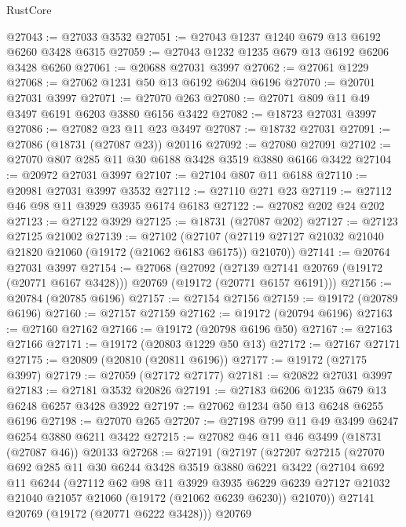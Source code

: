 \begin{lexlean}{RustCore}
\begin{coremodule}
@27043 := @27033 @3532
@27051 := @27043 @1237 @1240 @679 @13 @6192 @6260 @3428 @6315
@27059 := @27043 @1232 @1235 @679 @13 @6192 @6206 @3428 @6260
@27061 := @20688 @27031 @3997
@27062 := @27061 @1229
@27068 := @27062 @1231 @50 @13 @6192 @6204 @6196
@27070 := @20701 @27031 @3997
@27071 := @27070 @263
@27080 := @27071 @809 @11 @49 @3497 @6191 @6203 @3880 @6156 @3422
@27082 := @18723 @27031 @3997
@27086 := @27082 @23 @11 @23 @3497
@27087 := @18732 @27031
@27091 := @27086 (@18731 (@27087 @23)) @20116
@27092 := @27080 @27091
@27102 := @27070 @807 @285 @11 @30 @6188 @3428 @3519 @3880 @6166 @3422
@27104 := @20972 @27031 @3997
@27107 := @27104 @807 @11 @6188
@27110 := @20981 @27031 @3997 @3532
@27112 := @27110 @271 @23
@27119 := @27112 @46 @98 @11 @3929 @3935 @6174 @6183
@27122 := @27082 @202 @24 @202
@27123 := @27122 @3929
@27125 := @18731 (@27087 @202)
@27127 := @27123 @27125 @21002
@27139 := @27102
    (@27107 (@27119 @27127 @21032 @21040 @21820 @21060 (@19172 (@21062 @6183 @6175)) @21070))
@27141 := @20764 @27031 @3997
@27154 := @27068
    (@27092
      (@27139 @27141 @20769 (@19172 (@20771 @6167 @3428)))
      @20769
      (@19172 (@20771 @6157 @6191)))
@27156 := @20784 (@20785 @6196)
@27157 := @27154 @27156
@27159 := @19172 (@20789 @6196)
@27160 := @27157 @27159
@27162 := @19172 (@20794 @6196)
@27163 := @27160 @27162
@27166 := @19172 (@20798 @6196 @50)
@27167 := @27163 @27166
@27171 := @19172 (@20803 @1229 @50 @13)
@27172 := @27167 @27171
@27175 := @20809 (@20810 (@20811 @6196))
@27177 := @19172 (@27175 @3997)
@27179 := @27059 (@27172 @27177)
@27181 := @20822 @27031 @3997
@27183 := @27181 @3532 @20826
@27191 := @27183 @6206 @1235 @679 @13 @6248 @6257 @3428 @3922
@27197 := @27062 @1234 @50 @13 @6248 @6255 @6196
@27198 := @27070 @265
@27207 := @27198 @799 @11 @49 @3499 @6247 @6254 @3880 @6211 @3422
@27215 := @27082 @46 @11 @46 @3499 (@18731 (@27087 @46)) @20133
@27268 := @27191
    (@27197
      (@27207
        @27215
        (@27070
          @692
          @285
          @11
          @30
          @6244
          @3428
          @3519
          @3880
          @6221
          @3422
          (@27104
            @692
            @11
            @6244
            (@27112
              @62
              @98
              @11
              @3929
              @3935
              @6229
              @6239
              @27127
              @21032
              @21040
              @21057
              @21060
              (@19172 (@21062 @6239 @6230))
              @21070))
          @27141
          @20769
          (@19172 (@20771 @6222 @3428)))
        @20769

\end{coremodule}
\end{lexlean}
